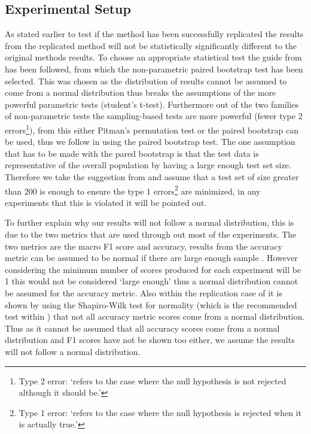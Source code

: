 \subsection{Experimental Setup}
As stated earlier to test if the method has been successfully replicated the results from the replicated method will not be statistically significantly different to the original methods results. To choose an appropriate statistical test the guide from \citet{repro_dror_2018} has been followed, from which the non-parametric paired bootstrap test \citep{repro_efron_1993} has been selected. This was chosen as the distribution of results cannot be assumed to come from a normal distribution thus breaks the assumptions of the more powerful parametric tests (student's t-test). Furthermore out of the two families of non-parametric tests the sampling-based tests are more powerful \citep{repro_dror_2018,repro_sogaard_2014} (fewer type 2 errors\footnote{Type 2 error: `refers to the case where the null hypothesis is not rejected although it should be.'\citep{repro_dror_2018}}), from this either Pitman's permutation test or the paired bootstrap can be used, thus we follow \citet{repro_sogaard_2014} in using the paired bootstrap test. The one assumption that has to be made with the pared bootstrap is that the test data is representative of the overall population by having a large enough test set size. Therefore we take the suggestion from \citet{repro_sogaard_2014} and assume that a test set of size greater than 200 is enough to ensure the type 1 errors\footnote{Type 1 error: `refers to the case where the null hypothesis is rejected when it is actually true.'\citep{repro_dror_2018}} are minimized, in any experiments that this is violated it will be pointed out.

To further explain why our results will not follow a normal distribution, this is due to the two metrics that are used through out most of the experiments. The two metrics are the macro F1 score and accuracy, results from the accuracy metric can be assumed to be normal if there are large enough sample \citep{repro_dror_2018}. However considering the minimum number of scores produced for each experiment will be 1 this would not be considered `large enough' thus a normal distribution cannot be assumed for the accuracy metric. Also within the replication case of \citet{repro_tang_2016} it is shown by using the Shapiro-Wilk test \citep{repro_shaphiro_1965} for normality (which is the recommended test within \citet{repro_dror_2018}) that not all accuracy metric scores come from a normal distribution. Thus as it cannot be assumed that all accuracy scores come from a normal distribution and F1 scores have not be shown too either, we assume the results will not follow a normal distribution.

